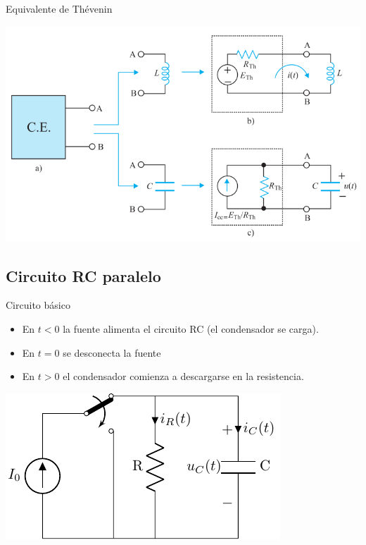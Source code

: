 \documentclass[aspectratio=169, xcolor={usenames,svgnames,dvipsnames}]{beamer}
\begin{document}
\begin{frame}[label={sec:org04c5267}]{Equivalente de Thévenin}
\begin{center}
\includegraphics[height=0.85\textheight]{figs/Thevenin_PrimerOrden.pdf}
\end{center}
\end{frame}
\subsection{Circuito RC paralelo}
\label{sec:org1ee2e69}

\begin{frame}[label={sec:org02ce7b8}]{Circuito básico}
\begin{itemize}
\item En \(t <0\) la fuente alimenta el circuito RC (el condensador se carga).
\item En \(t = 0\) se desconecta la fuente
\item En \(t > 0\) el condensador comienza a descargarse en la resistencia.
\end{itemize}

\begin{center}
\includegraphics[height=0.45\textheight]{figs/transitorio_circuitoRC.pdf}
\end{center}
\end{frame}
\end{document}
